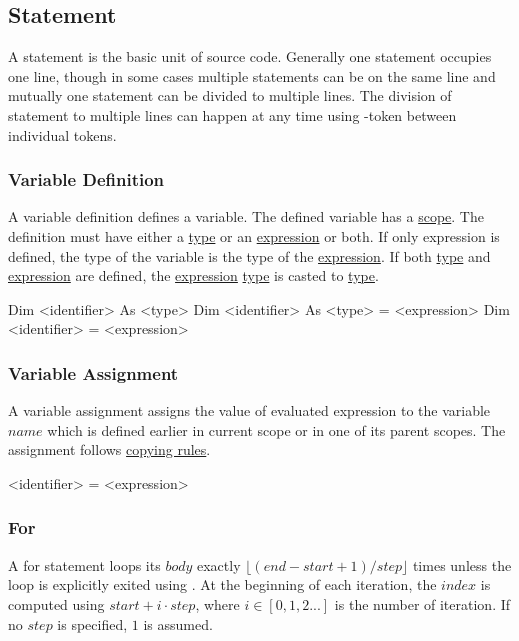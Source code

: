 \subsection{Statement}
\label{statement}
A statement is the basic unit of source code.
Generally one statement occupies one line,
though in some cases multiple statements can be on the same line
and mutually one statement can be divided to multiple lines.
The division of statement to multiple lines can happen
at any time using \token{\string_}-token between individual tokens.

\subsubsection{Variable Definition}
\label{stat:vardes}
A variable definition defines a variable.
The defined variable has a \hyperref[scope]{scope}.
The definition must have either a \hyperref[type]{type} or an \hyperref[expr]{expression} or both.
If only expression is defined, the type of the variable is the type of the \hyperref[expr]{expression}.
If both \hyperref[type]{type} and \hyperref[expr]{expression} are defined, the \hyperref[expr]{expression} \hyperref[type]{type} is casted to \hyperref[type]{type}.

\begin{grammar}
Dim <identifier> As <type>
Dim <identifier> As <type> = <expression>
Dim <identifier> = <expression>
\end{grammar}

\subsubsection{Variable Assignment}
\label{stat:varass}
A variable assignment assigns the value of evaluated expression to the variable $name$
which is defined earlier in current scope or in one of its parent scopes.
The assignment follows \hyperref[copying]{copying rules}.

\begin{grammar}
<identifier> = <expression>
\end{grammar}

\subsubsection{For}
\label{stat:for}
A for statement loops its $body$ exactly $\lfloor(end - start + 1) / step\rfloor$ times
unless the loop is explicitly exited using .
At the beginning of each iteration,
the $index$ is computed using $start + i \cdot step$,
where $i \in [0, 1, 2 ...]$ is the number of iteration.
If no $step$ is specified, $1$ is assumed.

